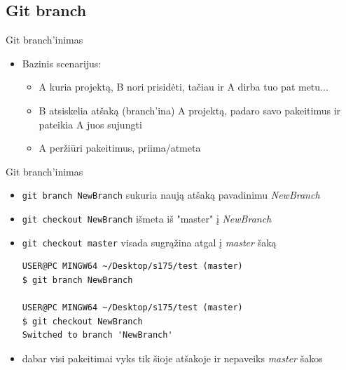 \documentclass[11pt,xcolor=table]{beamer}
\begin{document}
\subsection{Git branch}

\begin{frame}[fragile]{Git branch'inimas}
\begin{itemize}
\item Bazinis scenarijus:
\begin{itemize}
\item A kuria projektą, B nori prisidėti, tačiau ir A dirba tuo pat metu...
\item B atsiskelia atšaką (branch'ina) A projektą, padaro savo pakeitimus ir pateikia A juos sujungti
\item A peržiūri pakeitimus, priima/atmeta
\end{itemize}
\end{itemize}
\end{frame}

\begin{frame}[fragile]{Git branch'inimas}
\begin{itemize}

\item \colorbox{listinggray}{\lstinline|git branch NewBranch|}  sukuria naują atšaką pavadinimu \textit{NewBranch}
\item \colorbox{listinggray}{\lstinline|git checkout NewBranch|} išmeta iš "master" į \textit{NewBranch}
\item \colorbox{listinggray}{\lstinline|git checkout master|} visada sugrąžina atgal į \textit{master} šaką

\begin{lstlisting}
USER@PC MINGW64 ~/Desktop/s175/test (master)
$ git branch NewBranch

USER@PC MINGW64 ~/Desktop/s175/test (master)
$ git checkout NewBranch
Switched to branch 'NewBranch'
\end{lstlisting}

\item dabar visi pakeitimai vyks tik šioje atšakoje ir nepaveiks \textit{master} šakos
\end{itemize}
\end{frame}
\end{document}
